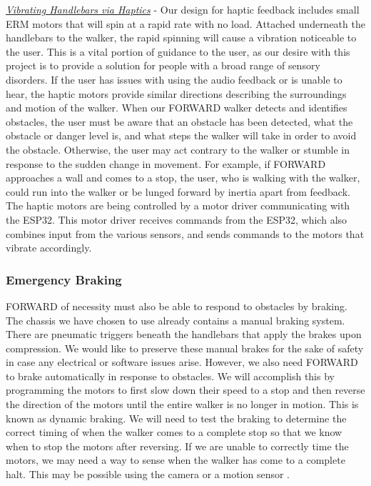 \noindent \underline{\textit{Vibrating Handlebars via Haptics}} -  Our design for haptic feedback includes small ERM motors that will spin at a rapid rate with no load. Attached underneath the handlebars to the walker, the rapid spinning will cause a vibration noticeable to the user. This is a vital portion of guidance to the user, as our desire with this project is to provide a solution for people with a broad range of sensory disorders. If the user has issues with using the audio feedback or is unable to hear, the haptic motors provide similar directions describing the surroundings and motion of the walker. When our FORWARD walker detects and identifies obstacles, the user must be aware that an obstacle has been detected, what the obstacle or danger level is, and what steps the walker will take in order to avoid the obstacle. Otherwise, the user may act contrary to the walker or stumble in response to the sudden change in movement. For example, if FORWARD approaches a wall and comes to a stop, the user, who is walking with the walker, could run into the walker or be lunged forward by inertia apart from feedback. The haptic motors are being controlled by a motor driver communicating with the ESP32. This motor driver receives commands from the ESP32, which also combines input from the various sensors, and sends commands to the motors that vibrate accordingly.

\subsubsection{Emergency Braking}
\noindent FORWARD of necessity must also be able to respond to obstacles by braking. The chassis we have chosen to use already contains a manual braking system. There are pneumatic triggers beneath the handlebars that apply the brakes upon compression. We would like to preserve these manual brakes for the sake of safety in case any electrical or software issues arise. However, we also need FORWARD to brake automatically in response to obstacles. We will accomplish this by programming the motors to first slow down their speed to a stop and then reverse the direction of the motors until the entire walker is no longer in motion. This is known as dynamic braking\cite{electricaleasy2014}. We will need to test the braking to determine the correct timing of when the walker comes to a complete stop so that we know when to stop the motors after reversing. If we are unable to correctly time the motors, we may need a way to sense when the walker has come to a complete halt. This may be possible using the camera or a motion sensor \cite{bayalarm2024}.

